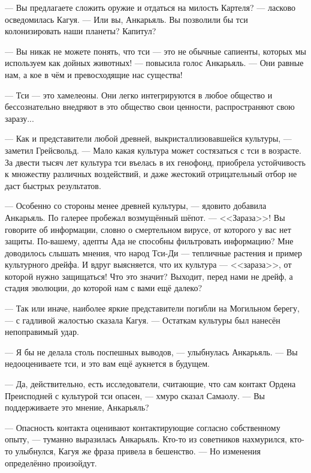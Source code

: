 --- Вы предлагаете сложить оружие и отдаться на милость Картеля? --- ласково осведомилась Кагуя.
--- Или вы, Анкарьяль.
Вы позволили бы тси колонизировать наши планеты?
Капитул?

--- Вы никак не можете понять, что тси --- это не обычные сапиенты, которых мы используем как дойных животных! --- повысила голос Анкарьяль.
--- Они равные нам, а кое в чём и превосходящие нас существа!

--- Тси --- это хамелеоны.
Они легко интегрируются в любое общество и бессознательно внедряют в это общество свои ценности, распространяют свою заразу...

--- Как и представители любой древней, выкристаллизовавшейся культуры, --- заметил Грейсвольд.
--- Мало какая культура может состязаться с тси в возрасте.
За двести тысяч лет культура тси въелась в их генофонд, приобрела устойчивость к множеству различных воздействий, и даже жестокий отрицательный отбор не даст быстрых результатов.

--- Особенно со стороны менее древней культуры, --- ядовито добавила Анкарьяль.
По галерее пробежал возмущённый шёпот.
--- <<Зараза>>!
Вы говорите об информации, словно о смертельном вирусе, от которого у вас нет защиты.
По-вашему, адепты Ада не способны фильтровать информацию?
Мне доводилось слышать мнения, что народ Тси-Ди --- тепличные растения и пример культурного дрейфа\FM.
И вдруг выясняется, что их культура --- <<зараза>>, от которой нужно защищаться!
Что это значит?
Выходит, перед нами не дрейф, а стадия эволюции, до которой нам с вами ещё далеко?

--- Так или иначе, наиболее яркие представители погибли на Могильном берегу, --- с гадливой жалостью сказала Кагуя.
--- Остаткам культуры был нанесён непоправимый удар.

--- Я бы не делала столь поспешных выводов, --- улыбнулась Анкарьяль.
--- Вы недооцениваете тси, и это вам ещё аукнется в будущем.

--- Да, действительно, есть исследователи, считающие, что сам контакт Ордена Преисподней с культурой тси опасен, --- хмуро сказал Самаолу.
--- Вы поддерживаете это мнение, Анкарьяль?

--- Опасность контакта оценивают контактирующие согласно собственному опыту, --- туманно выразилась Анкарьяль.
Кто-то из советников нахмурился, кто-то улыбнулся, Кагуя же фраза привела в бешенство.
--- Но изменения определённо произойдут.

